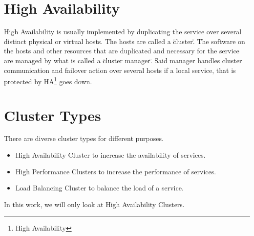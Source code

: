 \section{High Availability}


High Availability is usually implemented by duplicating the service over several distinct physical or
virtual hosts. The hosts are called a \"cluster\". The software on the hosts and other resources
that are duplicated and necessary for the service are managed by what is called a \"cluster manager\".
Said manager handles cluster communication and failover action over several hosts if a local service,
that is protected by HA\footnote{High Availability} goes down.

\section{Cluster Types}

There are diverse cluster types for different purposes.
\begin{itemize}
\item High Availability Cluster to increase the availability of services.
\item High Performance Clusters to increase the performance of services.
\item Load Balancing Cluster to balance the load of a service.
\end{itemize}


In this work, we will only look at High Availability Clusters.
